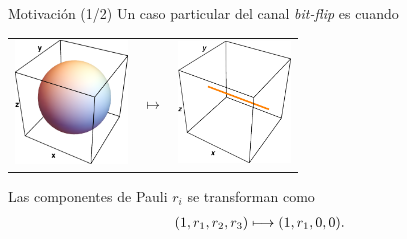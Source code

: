 \documentclass[xcolor=dvipsnames,presentation]{beamer}%
\begin{document}
\begin{frame}{Motivación (1/2)}
	Un caso particular del canal \textit{bit-flip} es cuando
	\begin{center}
	\begin{tabular}{m{2.5cm} m{1.5cm} m{2.5cm}}
		\includegraphics[width=3cm]{unit_sph}
		& \hfill \LARGE{$\longmapsto$}
		& \includegraphics[width=3cm]{bit_flip_p0_5}
	\end{tabular}
	\end{center}
	
	Las componentes de Pauli $r_i$ se transforman como
	\begin{align*}
	\qty(1,r_1,r_2,r_3)\longmapsto \qty(1,r_1,0,0).
	\end{align*}
	

\end{frame}
\end{document}
